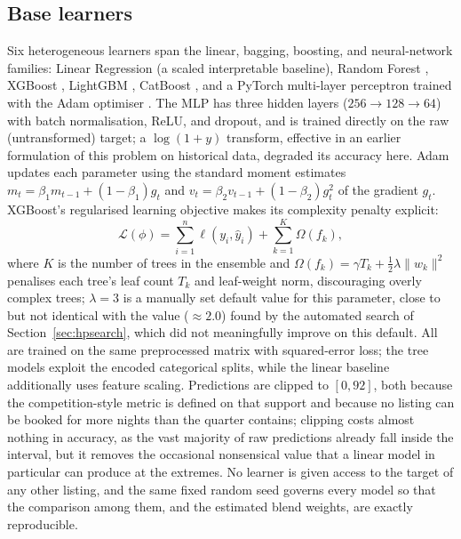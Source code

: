 \documentclass[review,12pt]{elsarticle}
\begin{document}
\subsection{Base learners}
Six heterogeneous learners span the linear, bagging, boosting, and neural-network
families: Linear Regression (a scaled interpretable baseline), Random Forest
\citep{breiman2001}, XGBoost \citep{chen2016xgboost}, LightGBM \citep{ke2017lightgbm},
CatBoost \citep{prokhorenkova2018catboost}, and a PyTorch \citep{paszke2019pytorch}
multi-layer perceptron trained with the Adam optimiser \citep{kingma2015adam}. The
MLP has three hidden layers ($256\!\to\!128\!\to\!64$) with batch normalisation,
ReLU, and dropout, and is trained directly on the raw (untransformed) target; a
$\log(1+y)$ transform, effective in an earlier formulation of this problem on
historical data, degraded its accuracy here. Adam updates each parameter using the standard moment
estimates $m_t=\beta_1 m_{t-1}+(1-\beta_1)g_t$ and
$v_t=\beta_2 v_{t-1}+(1-\beta_2)g_t^2$ of the gradient $g_t$. XGBoost's regularised
learning objective makes its complexity penalty explicit:
\begin{equation}
\mathcal{L}(\phi) = \sum_{i=1}^{n}\ell(y_i,\hat y_i) + \sum_{k=1}^{K}\Omega(f_k),
\label{eq:xgb-obj}
\end{equation}
where $K$ is the number of trees in the ensemble and
$\Omega(f_k)=\gamma T_k+\tfrac12\lambda\lVert w_k\rVert^2$ penalises each tree's
leaf count $T_k$ and leaf-weight norm, discouraging overly complex trees;
$\lambda=3$ is a manually set default value for this parameter, close to but not
identical with the value ($\approx2.0$) found by the automated search of
Section~\ref{sec:hpsearch}, which did not meaningfully improve on this default.
All are trained on the same preprocessed matrix
with squared-error loss; the tree models exploit the encoded categorical splits,
while the linear baseline additionally uses feature scaling. Predictions are
clipped to $[0,92]$, both because the competition-style metric is defined on that
support and because no listing can be booked for more nights than the quarter
contains; clipping costs almost nothing in accuracy, as the vast majority of raw
predictions already fall inside the interval, but it removes the occasional
nonsensical value that a linear model in particular can produce at the extremes. No
learner is given access to the target of any other listing, and the same fixed
random seed governs every model so that the comparison among them, and the estimated
blend weights, are exactly reproducible.
\end{document}
